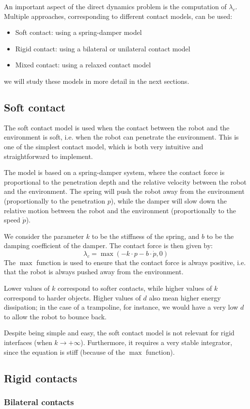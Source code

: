 An important aspect of the direct dynamics problem is the computation of $\lambda_c$. Multiple approaches, corresponding to different contact models, can be used:
\begin{itemize}
    \item Soft contact: using a spring-damper model
    \item Rigid contact: using a bilateral or unilateral contact model
    \item Mixed contact: using a relaxed contact model
\end{itemize}
we will study these models in more detail in the next sections.

\subsection{Soft contact}
The soft contact model is used when the contact between the robot and the environment is soft, i.e. when the robot can penetrate the environment. This is one of the simplest contact model, which is both very intuitive and straightforward to implement. 

The model is based on a spring-damper system, where the contact force is proportional to the penetration depth and the relative velocity between the robot and the environment. The spring will push the robot away from the environment (proportionally to the penetration $p$), while the damper will slow down the relative motion between the robot and the environment (proportionally to the speed $\dot{p}$).

We consider the parameter $k$ to be the stiffness of the spring, and $b$ to be the damping coefficient of the damper. The contact force is then given by:
\begin{equation}
    \lambda_c = \max(-k\cdot p - b\cdot\dot{p}, 0)
\end{equation}
The $\max$ function is used to ensure that the contact force is always positive, i.e. that the robot is always pushed away from the environment.

Lower values of $k$ correspond to softer contacts, while higher values of $k$ correspond to harder objects. Higher values of $d$ also mean higher energy dissipation; in the case of a trampoline, for instance, we would have a very low $d$ to allow the robot to bounce back.

Despite being simple and easy, the soft contact model is not relevant for rigid interfaces (when $k\to+\infty$). Furthermore, it requires a very stable integrator, since the equation is stiff (because of the $\max$ function).

\subsection{Rigid contacts}
\subsubsection{Bilateral contacts}